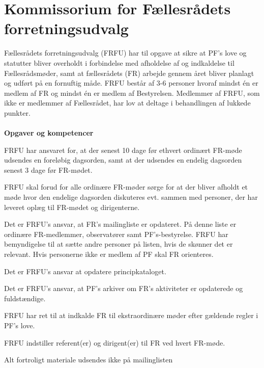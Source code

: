 \section{Kommissorium for Fællesrådets forretningsudvalg}
Fællesrådets forretningsudvalg (FRFU) har til opgave at sikre at PF’s love og statutter bliver overholdt i forbindelse
med afholdelse af og indkaldelse til Fællesrådsmøder, samt at fællesrådets (FR) arbejde gennem året bliver planlagt og
udført på en fornuftig måde. FRFU består af 3-6 personer hvoraf mindst én er medlem af FR og mindst én er medlem af
Bestyrelsen. Medlemmer af FRFU, som ikke er medlemmer af Fællesrådet, har lov at deltage i behandlingen af lukkede
punkter.\\
\\
\textbf{Opgaver og kompetencer}
\begin{list}{•}
\item FRFU har ansvaret for, at der senest 10 dage før ethvert ordinært FR-møde udsendes en foreløbig dagsorden, samt at der udsendes en endelig dagsorden senest 3 dage før FR-mødet.
\item FRFU skal forud for alle ordinære FR-møder sørge for at der bliver afholdt et møde hvor den endelige
dagsorden diskuteres evt. sammen med personer, der har leveret oplæg til FR-mødet og dirigenterne.
\item Det er FRFU’s ansvar, at FR’s mailingliste er opdateret. På denne liste er ordinære FR-medlemmer,
observatører samt PF’s-bestyrelse. FRFU har bemyndigelse til at sætte andre personer på listen, hvis de
skønner det er relevant. Hvis personerne ikke er medlem af PF skal FR orienteres.
\item Det er FRFU’s ansvar at opdatere principkataloget.
\item Det er FRFU’s ansvar, at PF’s arkiver om FR’s aktiviteter er opdaterede og fuldstændige.
\item FRFU har ret til at indkalde FR til ekstraordinære møder efter gældende regler i PF’s love.
\item FRFU indstiller referent(er) og dirigent(er) til FR ved hvert FR-møde.
\end{list}
\vspace{1cm}
Alt fortroligt materiale udsendes ikke på mailinglisten
